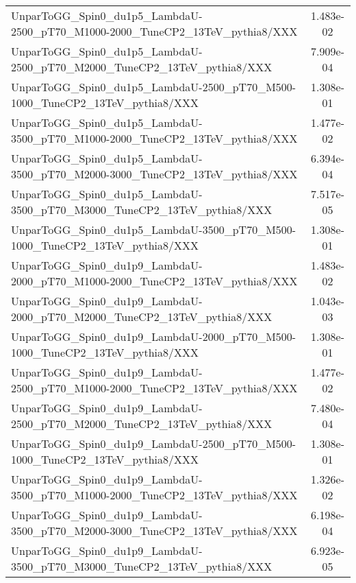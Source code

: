 \begin{landscape}
\begin{table}[!htbp]
\begin{tabular}{lc}
       UnparToGG\_Spin0\_du1p5\_LambdaU-2500\_pT70\_M1000-2000\_TuneCP2\_13TeV\_pythia8/XXX & 1.483e-02\\
       UnparToGG\_Spin0\_du1p5\_LambdaU-2500\_pT70\_M2000\_TuneCP2\_13TeV\_pythia8/XXX & 7.909e-04\\
       UnparToGG\_Spin0\_du1p5\_LambdaU-2500\_pT70\_M500-1000\_TuneCP2\_13TeV\_pythia8/XXX & 1.308e-01\\
       UnparToGG\_Spin0\_du1p5\_LambdaU-3500\_pT70\_M1000-2000\_TuneCP2\_13TeV\_pythia8/XXX & 1.477e-02\\
       UnparToGG\_Spin0\_du1p5\_LambdaU-3500\_pT70\_M2000-3000\_TuneCP2\_13TeV\_pythia8/XXX & 6.394e-04\\
       UnparToGG\_Spin0\_du1p5\_LambdaU-3500\_pT70\_M3000\_TuneCP2\_13TeV\_pythia8/XXX & 7.517e-05\\
       UnparToGG\_Spin0\_du1p5\_LambdaU-3500\_pT70\_M500-1000\_TuneCP2\_13TeV\_pythia8/XXX & 1.308e-01\\
       UnparToGG\_Spin0\_du1p9\_LambdaU-2000\_pT70\_M1000-2000\_TuneCP2\_13TeV\_pythia8/XXX & 1.483e-02\\
       UnparToGG\_Spin0\_du1p9\_LambdaU-2000\_pT70\_M2000\_TuneCP2\_13TeV\_pythia8/XXX & 1.043e-03\\
       UnparToGG\_Spin0\_du1p9\_LambdaU-2000\_pT70\_M500-1000\_TuneCP2\_13TeV\_pythia8/XXX & 1.308e-01\\
       UnparToGG\_Spin0\_du1p9\_LambdaU-2500\_pT70\_M1000-2000\_TuneCP2\_13TeV\_pythia8/XXX & 1.477e-02\\
       UnparToGG\_Spin0\_du1p9\_LambdaU-2500\_pT70\_M2000\_TuneCP2\_13TeV\_pythia8/XXX & 7.480e-04\\
       UnparToGG\_Spin0\_du1p9\_LambdaU-2500\_pT70\_M500-1000\_TuneCP2\_13TeV\_pythia8/XXX & 1.308e-01\\
       UnparToGG\_Spin0\_du1p9\_LambdaU-3500\_pT70\_M1000-2000\_TuneCP2\_13TeV\_pythia8/XXX & 1.326e-02\\
       UnparToGG\_Spin0\_du1p9\_LambdaU-3500\_pT70\_M2000-3000\_TuneCP2\_13TeV\_pythia8/XXX & 6.198e-04\\
       UnparToGG\_Spin0\_du1p9\_LambdaU-3500\_pT70\_M3000\_TuneCP2\_13TeV\_pythia8/XXX & 6.923e-05\\
       \hline \hline
       \end{tabular}
       \label{table:RSG_signal_samples_xsec}
\end{table}
\end{landscape}

